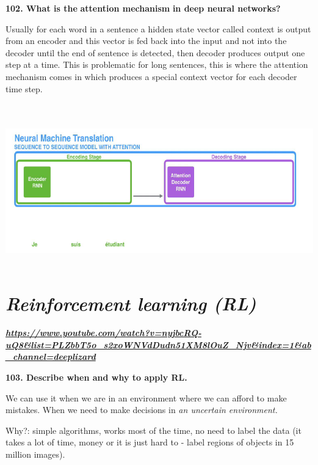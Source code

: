 \textbf{102. What is the} \textbf{attention mechanism} \textbf{in deep
neural networks?}

Usually for each word in a sentence a hidden state vector called context
is output from an encoder and this vector is fed back into the input and
not into the decoder until the end of sentence is detected, then decoder
produces output one step at a time. This is problematic for long
sentences, this is where the attention mechanism comes in which produces
a special context vector for each decoder time step.

\hypertarget{section}{%
\section{\texorpdfstring{\protect\includegraphics[width=6.05908in,height=2.45313in]{media/image18.png}}{}}\label{section}}

\hypertarget{reinforcement-learning-rl}{%
\section{\texorpdfstring{\textit{Reinforcement learning
(RL)}}{Reinforcement learning (RL)}}\label{reinforcement-learning-rl}}

\href{https://www.youtube.com/watch?v=nyjbcRQ-uQ8\&list=PLZbbT5o_s2xoWNVdDudn51XM8lOuZ_Njv\&index=1\&ab_channel=deeplizard}{\textbf{\textit{https://www.youtube.com/watch?v=nyjbcRQ-uQ8\&list=PLZbbT5o\_s2xoWNVdDudn51XM8lOuZ\_Njv\&index=1\&ab\_channel=deeplizard}}}

\textbf{103. Describe when and why to apply RL.}

We can use it when we are in an environment where we can afford to make
mistakes. When we need to make decisions in \textit{an uncertain
environment.}

Why?: simple algorithms, works most of the time, no need to label the
data (it takes a lot of time, money or it is just hard to - label
regions of objects in 15 million images).

